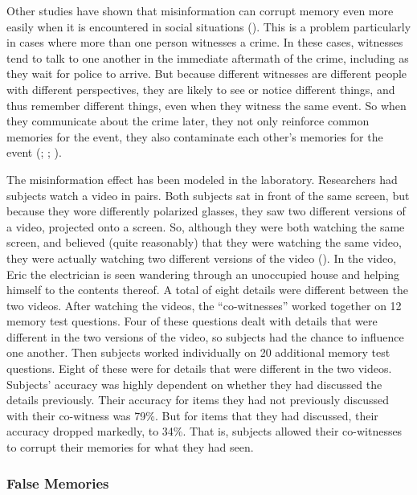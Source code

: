 \documentclass[
]{krantz}
\begin{document}
Other studies have shown that misinformation can corrupt memory even more easily when it is encountered in social situations (). This is a problem particularly in cases where more than one person witnesses a crime. In these cases, witnesses tend to talk to one another in the immediate aftermath of the crime, including as they wait for police to arrive. But because different witnesses are different people with different perspectives, they are likely to see or notice different things, and thus remember different things, even when they witness the same event. So when they communicate about the crime later, they not only reinforce common memories for the event, they also contaminate each other's memories for the event (; ; ).

The misinformation effect has been modeled in the laboratory. Researchers had subjects watch a video in pairs. Both subjects sat in front of the same screen, but because they wore differently polarized glasses, they saw two different versions of a video, projected onto a screen. So, although they were both watching the same screen, and believed (quite reasonably) that they were watching the same video, they were actually watching two different versions of the video (). In the video, Eric the electrician is seen wandering through an unoccupied house and helping himself to the contents thereof. A total of eight details were different between the two videos. After watching the videos, the ``co-witnesses'' worked together on 12 memory test questions. Four of these questions dealt with details that were different in the two versions of the video, so subjects had the chance to influence one another. Then subjects worked individually on 20 additional memory test questions. Eight of these were for details that were different in the two videos. Subjects' accuracy was highly dependent on whether they had discussed the details previously. Their accuracy for items they had not previously discussed with their co-witness was 79\%. But for items that they had discussed, their accuracy dropped markedly, to 34\%. That is, subjects allowed their co-witnesses to corrupt their memories for what they had seen.

\subsubsection*{False Memories}\label{false-memories}
\end{document}
